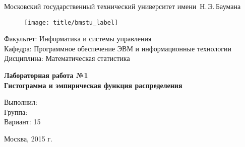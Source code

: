 
\thispagestyle{empty}

\begin{center}
    \Large
    Московский государственный технический университет имени~Н.\,Э.\,Баумана
\end{center}

\begin{figure}[h!]
    \begin{center}
        \texttt{[image: title/bmstu\_label]}
    \end{center}
\end{figure}

{\large
\noindent
Факультет: Информатика и системы управления\\[2mm]
\noindent
Кафедра: Программное обеспечение ЭВМ и информационные технологии\\[2mm]
\noindent
Дисциплина: Математическая статистика
\vspace{1.5cm}}

\begin{center}
    \Large
    \textbf{Лабораторная работа №1} \\
    \textbf{Гистограмма и эмпирическая функция распределения} \\
\end{center}
\vfill

\hfill\begin{minipage}{0.35\textwidth}
    Выполнил: \\
    Группа: \\
    Вариант: 15
\end{minipage}
\vfill

\begin{center}
    Москва, 2015 г.
\end{center}